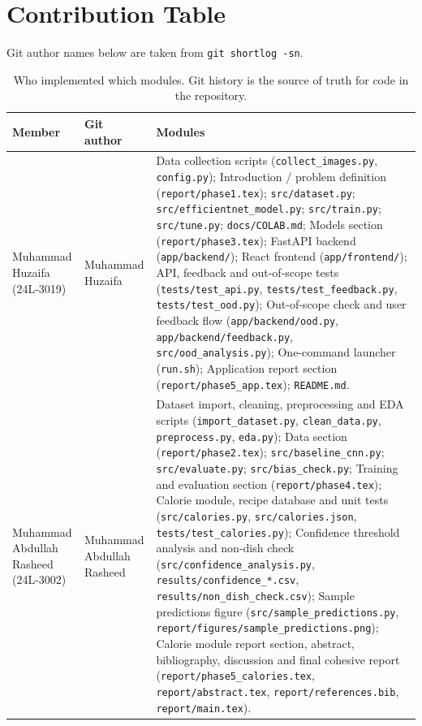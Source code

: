 \section{Contribution Table}

Git author names below are taken from \texttt{git shortlog -sn}.

\begin{table}[H]
  \centering
  \small
  \begin{tabular}{|p{3.2cm}|p{3.6cm}|p{7.2cm}|}
    \hline
    \textbf{Member} & \textbf{Git author} & \textbf{Modules} \\
    \hline
    Muhammad Huzaifa (24L-3019)
      & Muhammad Huzaifa
      & Data collection scripts (\texttt{collect\_images.py}, \texttt{config.py});
        Introduction / problem definition (\texttt{report/phase1.tex});
        \texttt{src/dataset.py};
        \texttt{src/efficientnet\_model.py};
        \texttt{src/train.py};
        \texttt{src/tune.py};
        \texttt{docs/COLAB.md};
        Models section (\texttt{report/phase3.tex});
        FastAPI backend (\texttt{app/backend/});
        React frontend (\texttt{app/frontend/});
        API, feedback and out-of-scope tests (\texttt{tests/test\_api.py}, \texttt{tests/test\_feedback.py}, \texttt{tests/test\_ood.py});
        Out-of-scope check and user feedback flow (\texttt{app/backend/ood.py}, \texttt{app/backend/feedback.py}, \texttt{src/ood\_analysis.py});
        One-command launcher (\texttt{run.sh});
        Application report section (\texttt{report/phase5\_app.tex});
        \texttt{README.md}. \\
    \hline
    Muhammad Abdullah Rasheed (24L-3002)
      & Muhammad Abdullah Rasheed
      & Dataset import, cleaning, preprocessing and EDA scripts (\texttt{import\_dataset.py}, \texttt{clean\_data.py}, \texttt{preprocess.py}, \texttt{eda.py});
        Data section (\texttt{report/phase2.tex});
        \texttt{src/baseline\_cnn.py};
        \texttt{src/evaluate.py};
        \texttt{src/bias\_check.py};
        Training and evaluation section (\texttt{report/phase4.tex});
        Calorie module, recipe database and unit tests (\texttt{src/calories.py}, \texttt{src/calories.json}, \texttt{tests/test\_calories.py});
        Confidence threshold analysis and non-dish check (\texttt{src/confidence\_analysis.py}, \texttt{results/confidence\_*.csv}, \texttt{results/non\_dish\_check.csv});
        Sample predictions figure (\texttt{src/sample\_predictions.py}, \texttt{report/figures/sample\_predictions.png});
        Calorie module report section, abstract, bibliography, discussion and final cohesive report (\texttt{report/phase5\_calories.tex}, \texttt{report/abstract.tex}, \texttt{report/references.bib}, \texttt{report/main.tex}). \\
    \hline
  \end{tabular}
  \caption{Who implemented which modules. Git history is the source of truth
  for code in the repository.}
\end{table}
